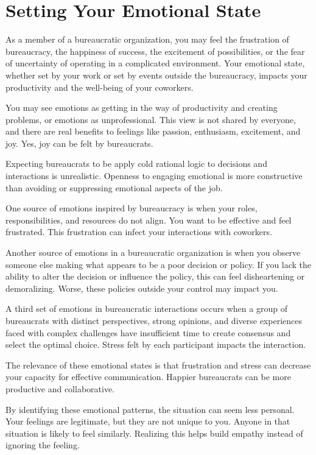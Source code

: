\section{Setting Your Emotional State}

As a member of a bureaucratic organization, you may feel the frustration of bureaucracy, the happiness of success, the excitement of possibilities, or the fear of uncertainty of operating in a complicated environment. Your emotional state, whether set by your work or set by events outside the bureaucracy, impacts your productivity and the well-being of your coworkers. 

You may see emotions as getting in the way of productivity and creating problems, or emotions as unprofessional. This view is not shared by everyone, and there are real benefits to feelings like passion, enthusiasm, excitement, and joy. Yes, joy can be felt by bureaucrats. 

Expecting bureaucrats to be apply cold rational logic to decisions and interactions is unrealistic. Openness to engaging emotional is more constructive than avoiding or suppressing emotional aspects of the job. 

One source of emotions inspired by bureaucracy is when your roles, responsibilities, and resources do not align. You want to be effective and feel frustrated. This frustration can infect your interactions with coworkers. 

Another source of emotions in a bureaucratic organization is when you observe someone else making what appears to be a poor decision or policy. If you lack the ability to alter the decision or influence the policy, this can feel disheartening or demoralizing. Worse, these policies outside your control may impact you. 

A third set of emotions in bureaucratic interactions occurs when a group of bureaucrats with distinct perspectives, strong opinions, and diverse experiences faced with complex challenges have insufficient time to create consensus and select the optimal choice. Stress felt by each participant impacts the interaction. 

The relevance of these emotional states is that frustration and stress can decrease your capacity for effective communication. Happier bureaucrats can be more productive and collaborative. 

By identifying these emotional patterns, the situation can seem less personal. Your feelings are legitimate, but they are not unique to you. Anyone in that situation is likely to feel similarly. Realizing this helps build empathy instead of ignoring the feeling. 